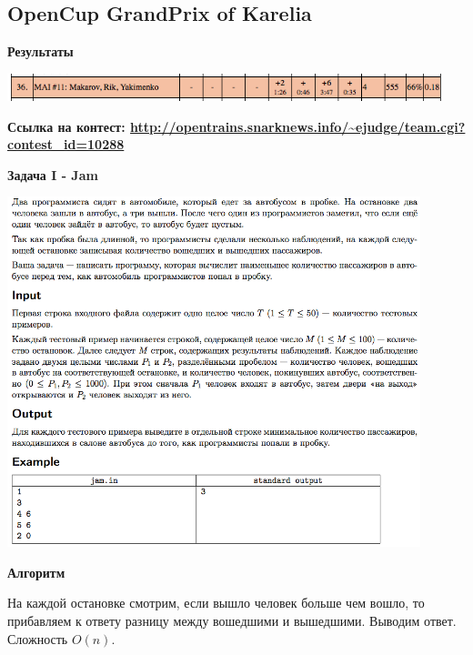 \documentclass[a4paper,12pt]{article}
\begin{document}
%
%
\newpage
\subsection{OpenCup GrandPrix of Karelia}

\textbf{{\large Результаты}} \\
\begin{center}
\includegraphics[width=0.95\textwidth]{OC_Karelia/OC_Karelia_result.png}\\ [1cm]
\end{center}

\textbf{{\large Ссылка на контест: \url{http://opentrains.snarknews.info/~ejudge/team.cgi?contest_id=10288}}}

\newpage
\textbf{{\large Задача I - Jam}}

\begin{center}
\includegraphics[width=0.9\textwidth]{OC_Karelia/OC_Karelia_I.png}\\ [1cm]
\end{center}

\newpage
\textbf{{\large Алгоритм}}

На каждой остановке смотрим, если вышло человек больше чем вошло, то прибавляем к ответу разницу между вошедшими и вышедшими. Выводим ответ. Сложность $O(n)$.\\
\end{document}
